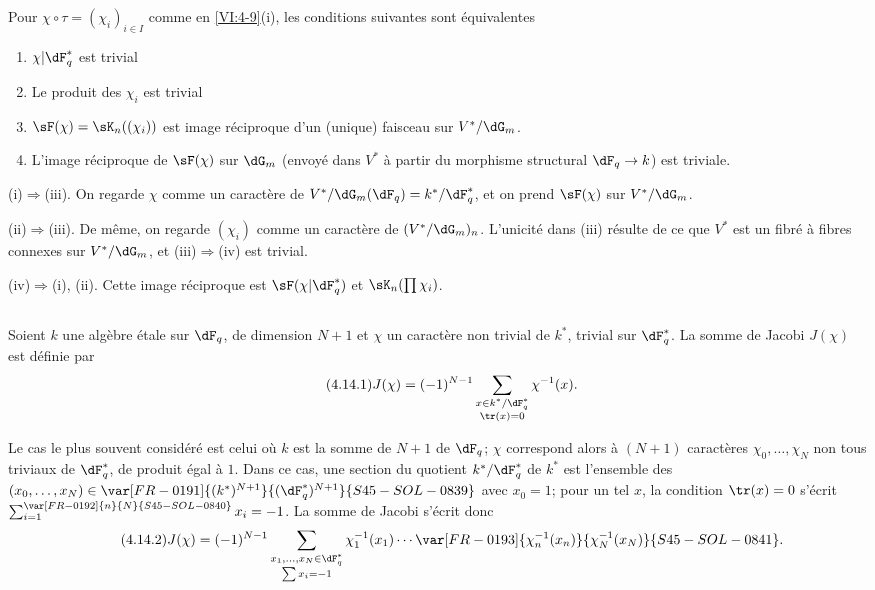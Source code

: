 \begin{lemma_}\label{VI:4-13}
Pour $\chi\circ \tau=(\chi_i)_{i\in I}$ comme en \ref{VI:4-9}(i), les
conditions suivantes sont équivalentes 
\begin{enumerate}[\indent (i)]
  \item $\chi| \dF_q^\ast$ est trivial 
  \item Le produit des $\chi_i$ est trivial 
  \item $\sF(\chi) = \sK_n((\chi_i))$ est image réciproque d'un (unique) 
    faisceau sur $V^\ast/\dG_m$. 
  \item L'image réciproque de $\sF(\chi)$ sur $\dG_m$ (envoyé dans 
    $V^\ast$ à partir du morphisme structural $\dF_q \to k$) est triviale. 
\end{enumerate}
\end{lemma_}

(i)$\Rightarrow$(iii). On regarde $\chi$ comme un caractère de 
$V^\ast/\dG_m(\dF_q)=k^\ast/\dF_q^\ast$, et on prend $\sF(\chi)$ sur 
$V^\ast/\dG_m$. 

(ii)$\Rightarrow$(iii). De même, on regarde $(\chi_i)$ comme un caractère 
de $(V^\ast/\dG_m)_n$. L'unicité dans (iii) résulte de ce que $V^\ast$ est 
un fibré à fibres connexes sur $V^\ast/\dG_m$, et (iii)$\Rightarrow$(iv)  
est trivial. 

(iv)$\Rightarrow$(i), (ii). Cette image réciproque est 
$\sF(\chi|\dF_q^\ast)$ et $\sK_n(\prod \chi_i)$. 





\subsection{}\label{VI:4-14}

Soient $k$ une algèbre étale sur $\dF_q$, de 
dimension $N+1$ et $\chi$ un caractère non trivial de $k^\ast$, trivial sur 
$\dF_q^\ast$. La somme de Jacobi $J(\chi)$ est définie par 
\begin{equation*}\tag{4.14.1}\label{VI:eq:4-14-1}
  J(\chi) = (-1)^{N-1} \sum_{\substack{x\in k^\ast/\dF_q^\ast \\ \tr(x)=0}} \chi^{-1}(x) \text{.} 
\end{equation*}

Le cas le plus souvent considéré est celui où $k$ est la somme de $N+1$
 de $\dF_q$; $\chi$ correspond alors à $(N+1)$ caractères
$\chi_0,\ldots,\chi_N$ non tous triviaux de $\dF_q^\ast$, de produit égal à $1$.
Dans ce cas, une section du quotient $k^\ast/\dF_q^\ast$ de $k^\ast$
est l'ensemble des $(x_0,\ldots,x_N)\in\var[FR-0191]{(k^\ast)^{N+1}}{(\dF_q^\ast)^{N+1}}{S45-SOL-0839}$ avec $x_0=1$;
pour un tel $x$, la condition $\tr(x)=0$ s'écrit $\sum_{i=1}^{\var[FR-0192]{n}{N}{S45-SOL-0840}}x_i=-1$.
La somme de Jacobi s'écrit donc
\begin{equation*}\tag{4.14.2}\label{VI:eq:4-14-2}
 J(\chi)=(-1)^{N-1}\sum_{\substack{x_1,\ldots,x_N\in\dF_q^\ast\\\sum x_i=-1}}
 \chi_1^{-1}(x_1)\cdots\var[FR-0193]{\chi_n^{-1}(x_n)}{\chi_N^{-1}(x_N)}{S45-SOL-0841} \text{.}
\end{equation*}

